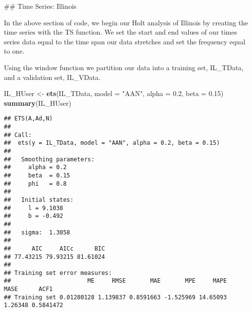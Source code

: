 \documentclass[
]{article}
\newenvironment{Shaded}{\begin{snugshade}}{\end{snugshade}}
\newcommand{\CommentTok}[1]{\textcolor[rgb]{0.56,0.35,0.01}{\textit{#1}}}
\newcommand{\DataTypeTok}[1]{\textcolor[rgb]{0.13,0.29,0.53}{#1}}
\newcommand{\DecValTok}[1]{\textcolor[rgb]{0.00,0.00,0.81}{#1}}
\newcommand{\FloatTok}[1]{\textcolor[rgb]{0.00,0.00,0.81}{#1}}
\newcommand{\KeywordTok}[1]{\textcolor[rgb]{0.13,0.29,0.53}{\textbf{#1}}}
\newcommand{\NormalTok}[1]{#1}
\newcommand{\OperatorTok}[1]{\textcolor[rgb]{0.81,0.36,0.00}{\textbf{#1}}}
\newcommand{\StringTok}[1]{\textcolor[rgb]{0.31,0.60,0.02}{#1}}
\begin{document}
\#\# Time Series: Illinois

\begin{Shaded}
\end{Shaded}

In the above section of code, we begin our Holt analysis of Illinois by
creating the time series with the TS function. We set the start and end
values of our times series data equal to the time span our data
stretches and set the frequency equal to one.

Using the window function we partition our data into a training set,
IL\_TData, and a validation set, IL\_VData.

\begin{Shaded}
\begin{Highlighting}[]
\NormalTok{IL_HUser <-}\StringTok{ }\KeywordTok{ets}\NormalTok{(IL_TData, }\DataTypeTok{model =} \StringTok{"AAN"}\NormalTok{, }\DataTypeTok{alpha =} \FloatTok{0.2}\NormalTok{, }\DataTypeTok{beta =} \FloatTok{0.15}\NormalTok{)}
\KeywordTok{summary}\NormalTok{(IL_HUser)}
\end{Highlighting}
\end{Shaded}

\begin{verbatim}
## ETS(A,Ad,N) 
## 
## Call:
##  ets(y = IL_TData, model = "AAN", alpha = 0.2, beta = 0.15) 
## 
##   Smoothing parameters:
##     alpha = 0.2 
##     beta  = 0.15 
##     phi   = 0.8 
## 
##   Initial states:
##     l = 9.1038 
##     b = -0.492 
## 
##   sigma:  1.3058
## 
##      AIC     AICc      BIC 
## 77.43215 79.93215 81.61024 
## 
## Training set error measures:
##                      ME     RMSE       MAE       MPE     MAPE    MASE      ACF1
## Training set 0.01280128 1.139837 0.8591663 -1.525969 14.65093 1.26348 0.5841472
\end{verbatim}
\end{document}
